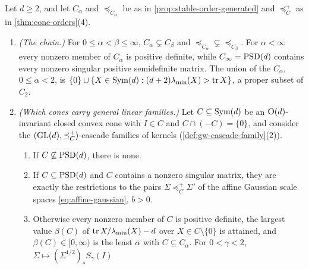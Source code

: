 \begin{theorem}
\label{thm:wedge-axis}
\leanok
Let $d \ge 2$, and let $C_\alpha$ and $\preceq_{C_\alpha}$ be as in \ref{prop:stable-order-generated} and
$\preceq^+_C$ as in \ref{thm:cone-orders}(4).
\begin{enumerate}
\item \emph{(The chain.)} For $0 \le \alpha < \beta \le \infty$, $C_\alpha \subsetneq C_\beta$ and
$\preceq_{C_\alpha} \subsetneq \preceq_{C_\beta}$. For $\alpha < \infty$ every nonzero member of $C_\alpha$ is positive
definite, while $C_\infty = \mathrm{PSD}(d)$ contains every nonzero singular positive semidefinite matrix. The union of
the $C_\alpha$, $0 \le \alpha < 2$, is $\{0\} \cup \{X \in \mathrm{Sym}(d) : (d+2)\lambda_{\min}(X) > \operatorname{tr} X\}$, a proper
subset of $C_2$.
\item \emph{(Which cones carry general linear families.)} Let $C \subseteq \mathrm{Sym}(d)$ be an $\mathrm{O}(d)$-invariant
closed convex cone with $I \in C$ and $C \cap (-C) = \{0\}$, and consider the
$(\mathrm{GL}(d), \preceq^+_C)$-cascade families of kernels (\ref{def:gw-cascade-family}(2)).
\begin{enumerate}
\item[(a)] If $C \not\subseteq \mathrm{PSD}(d)$, there is none.
\item[(b)] If $C \subseteq \mathrm{PSD}(d)$ and $C$ contains a nonzero singular matrix, they are exactly the
restrictions to the pairs $\Sigma \preceq^+_C \Sigma'$ of the affine Gaussian scale spaces
\ref{eq:affine-gaussian}, $b > 0$.
\item[(c)] Otherwise every nonzero member of $C$ is positive definite, the largest value $\beta(C)$ of
$\operatorname{tr} X/\lambda_{\min}(X) - d$ over $X \in C \setminus \{0\}$ is attained, and $\beta(C) \in [0, \infty)$ is the
least $\alpha$ with $C \subseteq C_\alpha$. For $0 < \gamma < 2$, $\Sigma \mapsto (\Sigma^{1/2})_*S_\gamma(I)$

\end{enumerate}
\end{enumerate}
\end{theorem}
